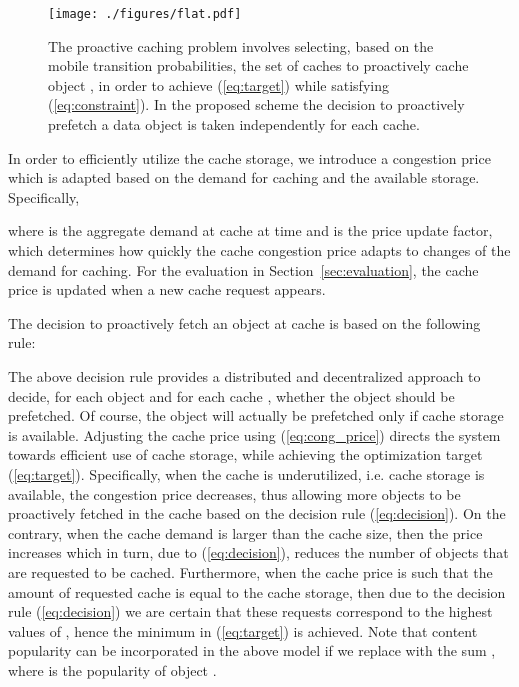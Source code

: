 \documentclass[conference]{IEEEtran}
\newcommand{\mynote}[1]{{{\medskip
\footnotesize \em \noindent Note: #1}}\medskip}
\renewcommand{\mynote}[1]{}
\begin{document}
\begin{figure}[b]
\vspace{-0.1in}
\centering
\texttt{[image: ./figures/flat.pdf]}
\vspace{-0.05in}
\caption{The proactive caching problem involves selecting, based on the mobile transition probabilities, the set  of caches to proactively cache object , in order to achieve (\ref{eq:target}) while satisfying (\ref{eq:constraint}). In the proposed  scheme the decision  to proactively prefetch a data object is taken independently for each cache.}
\label{fig:flat}
\end{figure}






In order to efficiently utilize the cache storage, we introduce a congestion price  which is adapted based on the demand for caching and the available storage.
Specifically,

where  is the aggregate demand at cache  at time  and  is the price update factor, which  determines how quickly the cache congestion price adapts to changes of the demand for caching.
For the evaluation in Section~\ref{sec:evaluation}, the cache price is updated when a new cache request appears.

\mynote{
The implementation uses a slightly  different cache price update. Need to decide if we need to change above.
}

The decision to proactively fetch an object  at cache  is based on  the following  rule:

The above decision rule provides a distributed and decentralized approach to decide, for each object  and for each cache , whether the object should be prefetched.
Of course, the object will actually be prefetched only if cache storage is available.
Adjusting the cache price using (\ref{eq:cong_price}) directs the system towards efficient use of cache storage, while achieving the optimization  target (\ref{eq:target}). Specifically, when the cache is underutilized, i.e. cache storage is available,  the congestion price decreases, thus allowing more objects to be proactively fetched in the cache based on the decision rule (\ref{eq:decision}). On the contrary, when the cache demand  is larger than the cache size, then the price increases which in turn, due to (\ref{eq:decision}), reduces the number of objects that are requested to be  cached.
Furthermore, when the cache price is such that the  amount of requested cache is equal to the cache storage, then due to the decision rule (\ref{eq:decision}) we are certain that these requests correspond to the highest values of , hence the minimum in (\ref{eq:target}) is achieved.
Note that content popularity can be incorporated in the above model if we replace  with the sum , where  is the popularity of object .
\end{document}
